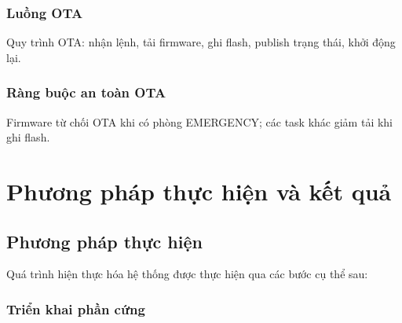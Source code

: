 \documentclass[../BTL_PTIT.tex]{subfiles}
\begin{document}
\subsubsection{Luồng OTA}
Quy trình OTA: nhận lệnh, tải firmware, ghi flash, publish trạng thái, khởi động lại.

\subsubsection{Ràng buộc an toàn OTA}
Firmware từ chối OTA khi có phòng EMERGENCY; các task khác giảm tải khi ghi flash.

\section{Phương pháp thực hiện và kết quả}

\subsection{Phương pháp thực hiện}

Quá trình hiện thực hóa hệ thống được thực hiện qua các bước cụ thể sau:

\subsubsection{Triển khai phần cứng}
\end{document}
